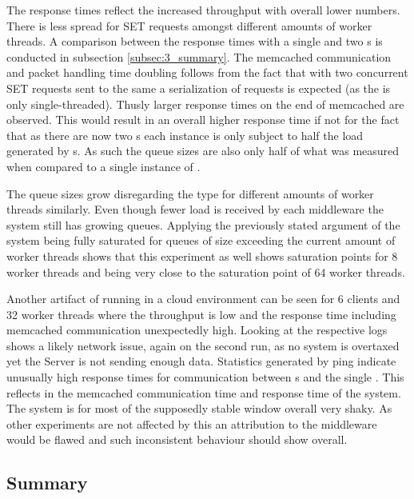             The response times reflect the increased throughput with overall lower numbers. There is less spread for SET
            requests amongst different amounts of worker threads. A comparison between the response times with a single
            \mw{} and two \mw{}s is conducted in subsection \ref{subsec:3_summary}. The memcached communication and
            packet handling time doubling follows from the fact that with two concurrent \mw{} SET requests sent to the
            same \srv{} a serialization of requests is expected (as the \srv{} is only single-threaded). Thusly larger
            response times on the end of memcached are observed. This would result in an overall higher response time if
            not for the fact that as there are now two \mw{}s each instance is only subject to half the load generated
            by \cli{}s. As such the queue sizes are also only half of what was measured when compared to a single
            instance of \mw{}.

            The queue sizes grow disregarding the type for different amounts of worker threads similarly. Even though
            fewer load is received by each middleware the system still has growing queues. Applying the previously
            stated argument of the system being fully saturated for queues of size exceeding the current amount of
            worker threads shows that this experiment as well shows saturation points for 8 worker threads
            and being very close to the saturation point of 64 worker threads.

            Another artifact of running in a cloud environment can be seen for 6 clients and 32 worker threads where the
            throughput is low and the response time including memcached communication unexpectedly high. Looking at the
            respective logs shows a likely network issue, again on the second run, as no system is overtaxed yet the
            Server is not sending enough data. Statistics generated by ping indicate unusually high response times for
            communication between \mw{}s and the single \srv{}. This reflects in the memcached communication time and
            response time of the system. The system is for most of the supposedly stable window overall very shaky. As
            other experiments are not affected by this an attribution to the middleware would be flawed and such
            inconsistent behaviour should show overall.

    \subsection{Summary\label{subsec:3_summary}}

